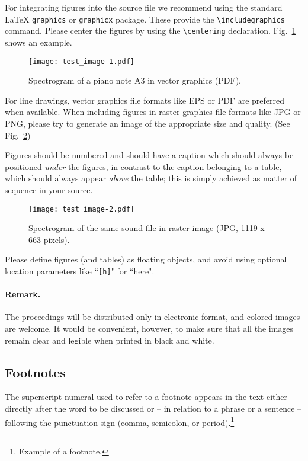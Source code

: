 \documentclass[runningheads,a4paper]{llncs}
\begin{document}
For integrating figures into the source file we recommend using the
standard \LaTeX{} \verb+graphics+ or \verb+graphicx+ package. These provide
the \verb+\includegraphics+ command. Please center the figures by using the
\verb+\centering+ declaration. Fig.~\ref{fig:example_1} shows an example.

\begin{figure}
\centering
\texttt{[image: test\_image-1.pdf]}
\caption{Spectrogram of a piano note A3 in vector graphics (PDF).}
\label{fig:example_1}
\end{figure}

For line drawings, vector graphics file formats like EPS or PDF are preferred
when available. When including figures in raster graphics file formats like
JPG or PNG, please try to generate an image of the appropriate size and
quality. (See Fig.~\ref{fig:example_2})

Figures should be numbered and should have a caption which should always be
positioned \emph{under} the figures, in contrast to the caption belonging
to a table, which should always appear \emph{above} the table; this is
simply achieved as matter of sequence in your source.

\begin{figure}
\centering
\texttt{[image: test\_image-2.pdf]}
\caption{Spectrogram of the same sound file in raster image (JPG,
1119 x  663 pixels).}
\label{fig:example_2}
\end{figure}

Please define figures (and tables) as floating objects, and avoid using
optional location parameters like ``\verb+[h]+" for ``here".

\paragraph{Remark.}

The proceedings will be distributed only in electronic format, and colored
images are welcome. It would be convenient, however, to make sure that all
the images remain clear and legible when printed in black and white.

\subsection{Footnotes}

The superscript numeral used to refer to a footnote appears in the text
either directly after the word to be discussed or -- in relation to a
phrase or a sentence -- following the punctuation sign (comma, semicolon,
or period).\footnote{Example of a footnote.}
\end{document}

